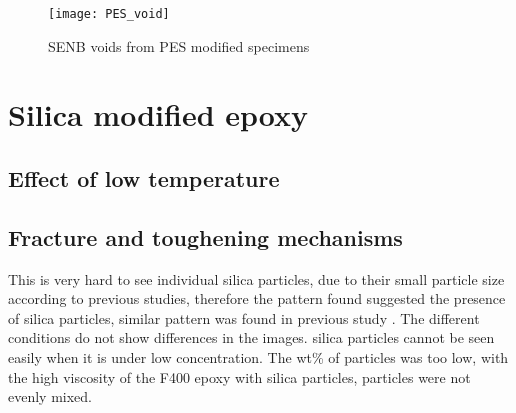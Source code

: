 \documentclass[numbers=noendperiod,chapterprefix=on]{icldt} %
\begin{document}
{\begin{figure}[!htpb]
\centering
\texttt{[image: PES\_void]}
\caption{SENB voids from PES modified specimens} \label{PES_void}
\end{figure}
\FloatBarrier



%
%
%

\section{Silica modified epoxy}





\subsection{Effect of low temperature}

\subsection{Fracture and toughening mechanisms}

This is very hard to see individual silica particles, due to their small particle size according to previous studies, therefore the pattern found suggested the presence of silica particles, similar pattern was found in previous study \cite{Hsieh2010a}.
The different conditions do not show differences in the images. 
silica particles cannot be seen easily when it is under low concentration. The wt\% of particles was too low, with the high viscosity of the F400 epoxy with silica particles, particles were not evenly mixed. 

}
\end{document}
